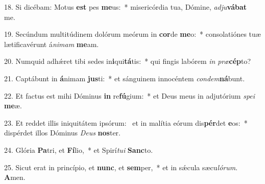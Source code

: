 18. Si dicébam: Motus \textbf{est} pes \textbf{me}us:~*  misericórdia tua, Dómine, \textit{ad}\textit{ju}\textbf{vá}\textbf{bat} me.\

19. Secúndum multitúdinem dolórum meórum in \textbf{cor}de \textbf{me}o:~*  consolatiónes tuæ lætificavérunt á\textit{ni}\textit{mam} \textbf{me}am.\

20. Numquid adhǽret tibi sedes in\textbf{i}qui\textbf{tá}tis:~*  qui fingis labórem \textit{in} \textit{præ}\textbf{cép}to?\

21. Captábunt in \textbf{á}nimam \textbf{jus}ti:~*  et sánguinem innocéntem \textit{con}\textit{dem}\textbf{ná}bunt.\

22. Et factus est mihi Dóminus \textbf{in} re\textbf{fú}gium:~*  et Deus meus in adjutórium \textit{spe}\textit{i} \textbf{me}æ.\

23. Et reddet illis iniquitátem ipsórum: \dag\  et in malítia eórum dis\textbf{pér}det \textbf{e}os:~*  dispérdet illos Dóminus \textit{De}\textit{us} \textbf{nos}ter.\

24. Glória \textbf{Pa}tri, et \textbf{Fí}lio,~*  et Spirí\textit{tu}\textit{i} \textbf{Sanc}to.\

25. Sicut erat in princípio, et \textbf{nunc}, et \textbf{sem}per,~*  et in sǽcula sæcu\textit{ló}\textit{rum}. \textbf{A}men.\

